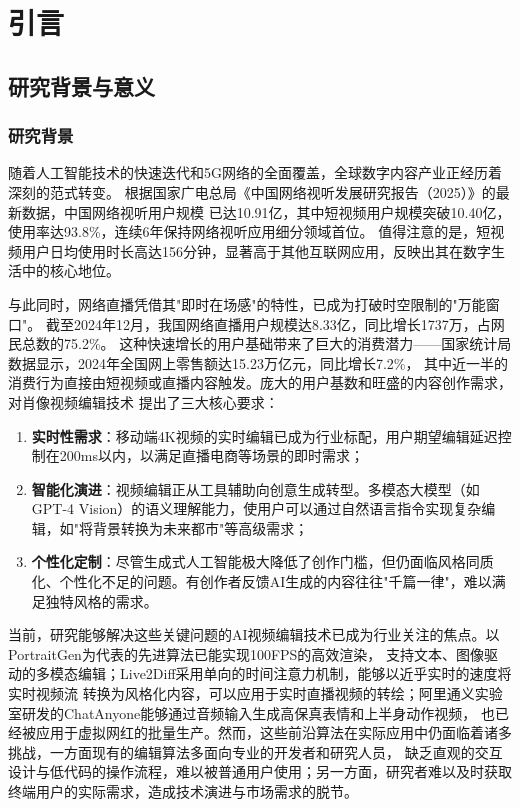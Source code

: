 
\chapter{引言}

\section{研究背景与意义}

\subsection{研究背景}

随着人工智能技术的快速迭代和5G网络的全面覆盖，全球数字内容产业正经历着深刻的范式转变。
根据国家广电总局《中国网络视听发展研究报告（2025）》\cite{NRTA2025}的最新数据，中国网络视听用户规模
已达10.91亿，其中短视频用户规模突破10.40亿，使用率达93.8\%，连续6年保持网络视听应用细分领域首位。
值得注意的是，短视频用户日均使用时长高达156分钟，显著高于其他互联网应用，反映出其在数字生活中的核心地位。

与此同时，网络直播凭借其"即时在场感"的特性，已成为打破时空限制的"万能窗口"。
截至2024年12月，我国网络直播用户规模达8.33亿，同比增长1737万，占网民总数的75.2\%。
这种快速增长的用户基础带来了巨大的消费潜力——国家统计局数据显示\cite{statsbureau2024}，2024年全国网上零售额达15.23万亿元，同比增长7.2\%，
其中近一半的消费行为直接由短视频或直播内容触发。庞大的用户基数和旺盛的内容创作需求，对肖像视频编辑技术
提出了三大核心要求：
\begin{enumerate}
    \item \textbf{实时性需求}：移动端4K视频的实时编辑已成为行业标配，用户期望编辑延迟控制在200ms以内，以满足直播电商等场景的即时需求；
    \item \textbf{智能化演进}：视频编辑正从工具辅助向创意生成转型。多模态大模型（如GPT-4 Vision）的语义理解能力，使用户可以通过自然语言指令实现复杂编辑，如"将背景转换为未来都市"等高级需求；
    \item \textbf{个性化定制}：尽管生成式人工智能极大降低了创作门槛，但仍面临风格同质化、个性化不足的问题。有创作者反馈AI生成的内容往往"千篇一律"，难以满足独特风格的需求。
\end{enumerate}

当前，研究能够解决这些关键问题的AI视频编辑技术已成为行业关注的焦点。以PortraitGen\cite{gao2024portrait}为代表的先进算法已能实现100FPS的高效渲染，
支持文本、图像驱动的多模态编辑；Live2Diff\cite{xing2024live2diff}采用单向的时间注意力机制，能够以近乎实时的速度将实时视频流
转换为风格化内容，可以应用于实时直播视频的转绘；阿里通义实验室研发的ChatAnyone\cite{qi2025chatanyone}能够通过音频输入生成高保真表情和上半身动作视频，
也已经被应用于虚拟网红的批量生产。然而，这些前沿算法在实际应用中仍面临着诸多挑战，一方面现有的编辑算法多面向专业的开发者和研究人员，
缺乏直观的交互设计与低代码的操作流程，难以被普通用户使用；另一方面，研究者难以及时获取终端用户的实际需求，造成技术演进与市场需求的脱节。

